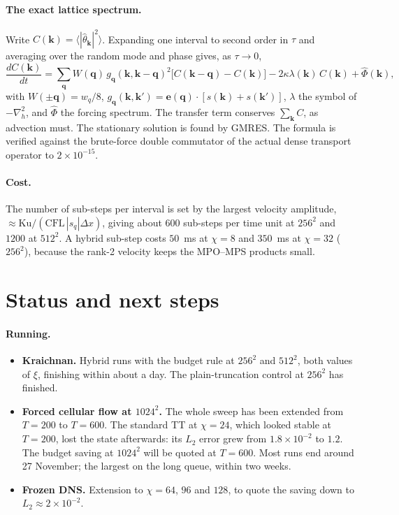 \documentclass[aps,prfluids,reprint,onecolumn,amsmath,amssymb,nofootinbib,floatfix]{revtex4-2}
\begin{document}
\paragraph{The exact lattice spectrum.} Write $C(\mathbf{k})=\langle|\hat\theta_{\mathbf{k}}|^2\rangle$.
Expanding one interval to second order in $\tau$ and averaging over the random
mode and phase gives, as $\tau\to0$,
\begin{equation}
\frac{dC(\mathbf{k})}{dt} = \sum_{\mathbf{q}} W(\mathbf{q})\,g_{\mathbf{q}}(\mathbf{k},\mathbf{k}-\mathbf{q})^2
\big[C(\mathbf{k}-\mathbf{q})-C(\mathbf{k})\big] - 2\kappa\lambda(\mathbf{k})\,C(\mathbf{k})
+ \hat\Phi(\mathbf{k}),
\end{equation}
with $W(\pm\mathbf{q})=w_q/8$,
$g_{\mathbf{q}}(\mathbf{k},\mathbf{k}')=\mathbf{e}(\mathbf{q})\!\cdot\![s(\mathbf{k})+s(\mathbf{k}')]$,
$\lambda$ the symbol of $-\nabla_h^2$, and $\hat\Phi$ the forcing spectrum. The
transfer term conserves $\sum_{\mathbf{k}}C$, as advection must. The stationary
solution is found by GMRES. The formula is verified against the brute-force
double commutator of the actual dense transport operator to $2\times10^{-15}$.

\paragraph{Cost.} The number of sub-steps per interval is set by the largest
velocity amplitude, $\approx\mathrm{Ku}/(\mathrm{CFL}\,|s_q|\Delta x)$, giving
about $600$ sub-steps per time unit at $256^2$ and $1200$ at $512^2$. A hybrid
sub-step costs $50$~ms at $\chi=8$ and $350$~ms at $\chi=32$ ($256^2$), because
the rank-2 velocity keeps the MPO--MPS products small.

\section{Status and next steps}

\paragraph{Running.}
\begin{itemize}
\item \textbf{Kraichnan.} Hybrid runs with the budget rule at $256^2$ and
      $512^2$, both values of $\xi$, finishing within about a day. The
      plain-truncation control at $256^2$ has finished.
\item \textbf{Forced cellular flow at $1024^2$.} The whole sweep has been extended
      from $T=200$ to $T=600$. The standard TT at $\chi=24$, which looked stable
      at $T=200$, lost the state afterwards: its $L_2$ error grew from
      $1.8\times10^{-2}$ to $1.2$. The budget saving at $1024^2$ will be quoted
      at $T=600$. Most runs end around 27 November; the largest on the long
      queue, within two weeks.
\item \textbf{Frozen DNS.} Extension to $\chi=64$, $96$ and $128$, to quote the
      saving down to $L_2\approx2\times10^{-2}$.
\end{itemize}
\end{document}
